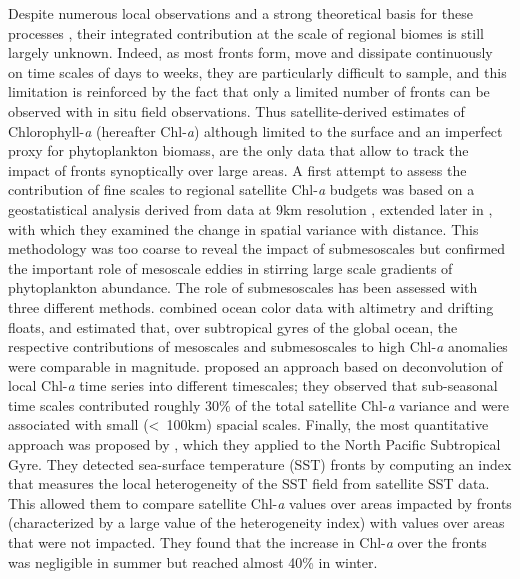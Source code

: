 Despite numerous local observations and a strong theoretical basis for these processes \citep[e.g. recent studies by][]{marrec_2018, little_2018, verneil_2019, ruiz_2019, uchida_2020, kessouri_2020, tzortzis_2021}, their integrated contribution at the scale of regional biomes is still largely unknown.
Indeed, as most fronts form, move and dissipate continuously on time scales of days to weeks, they are particularly difficult to sample, and this limitation is reinforced by the fact that only a limited number of fronts can be observed with in situ field observations.
Thus satellite-derived estimates of Chlorophyll\nobreakdash-\emph{a} (hereafter Chl\nobreakdash-\emph{a}) although limited to the surface and an imperfect proxy for phytoplankton biomass, are the only data that allow to track the impact of fronts synoptically over large areas.
A first attempt to assess the contribution of fine scales to regional satellite Chl\nobreakdash-\emph{a} budgets was based on a geostatistical analysis derived from data at 9km resolution \citep{doney_2003}, extended later in \citet{glover_2018}, with which they examined the change in spatial variance with distance.
This methodology was too coarse to reveal the impact of submesoscales but confirmed the important role of mesoscale eddies in stirring large scale gradients of phytoplankton abundance.
The role of submesoscales has been assessed with three different methods.
\citet{guo_2019} combined ocean color data with altimetry and drifting floats, and estimated that, over subtropical gyres of the global ocean, the respective contributions of mesoscales and submesoscales to high Chl\nobreakdash-\emph{a} anomalies were comparable in magnitude.
\citet{keerthi_2022} proposed an approach based on deconvolution of local Chl\nobreakdash-\emph{a} time series into different timescales; they observed that sub-seasonal time scales contributed roughly 30\% of the total satellite Chl\nobreakdash-\emph{a} variance and were associated with small (\textless\ 100km) spacial scales.
Finally, the most quantitative approach was proposed by \citet{liu_2016}, which they applied to the North Pacific Subtropical Gyre.
They detected sea-surface temperature (SST) fronts by computing an index that measures the local heterogeneity of the SST field from satellite SST data.
This allowed them to compare satellite Chl\nobreakdash-\emph{a} values over areas impacted by fronts (characterized by a large value of the heterogeneity index) with values over areas that were not impacted.
They found that the increase in Chl\nobreakdash-\emph{a} over the fronts was negligible in summer but reached almost 40\% in winter.

